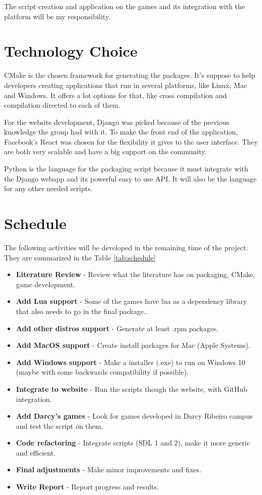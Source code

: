 The script creation and application on the games and its integration with the
platform will be my responsibility.


\section[Technology Choice]{Technology Choice}

CMake is the chosen framework for generating the packages. It's suppose to help developers creating applications that run in several platforms, like Linux, Mac and Windows. It offers a lot options for that, like cross compilation and compilation directed to each of them.

For the website development, Django  was picked because of the previous knowledge the group had with it. To make the front end of the application, Facebook's React was chosen for the flexibility it gives to the user interface. They are both very scalable and have a big support on the community.

Python is the language for the packaging script because it must integrate with the Django webapp and its powerful easy to use API. It will also be the language for any other needed scripts.


\section[Schedule]{Schedule}

The following activities will be developed in the remaining time of the project. They are summarized in the Table \ref{tab:schedule}

\begin{itemize}
\item \textbf{Literature Review} - Review what the literature has on packaging, CMake, game development.
\item \textbf{Add Lua support} - Some of the games have lua as a dependency library that also needs to go in the final package..
\item \textbf{Add other distros support} - Generate at least .rpm packages.
\item \textbf{Add MacOS support} - Create install packages for Mac (Apple Systems).
\item \textbf{Add Windows support} - Make a installer (.exe) to run on Windows 10 (maybe with some backwards compatibility if possible).
\item \textbf{Integrate to website} - Run the scripts though the website, with GitHub integration.
\item \textbf{Add Darcy's games} - Look for games developed in Darcy Ribeiro campus and test the script on them.
\item \textbf{Code refactoring} - Integrate scripts (SDL 1 and 2), make it more generic and efficient.
\item \textbf{Final adjustments} - Make minor improvements and fixes.
\item \textbf{Write Report} - Report progress and results.
\end{itemize}

